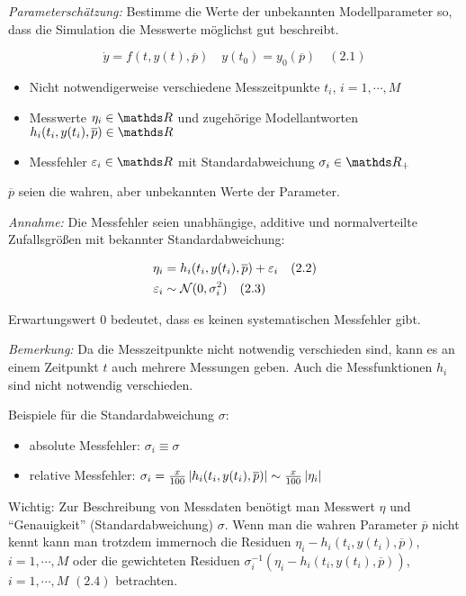 
\emph{Parameterschätzung:} Bestimme die Werte der unbekannten Modellparameter so, dass die Simulation die Messwerte möglichst gut beschreibt.



\[\dot y = f(t,y(t),\overline p) \quad y(t_0) = y_0(\overline p) \quad (2.1)\]


\begin{itemize}
\item Nicht notwendigerweise verschiedene Messzeitpunkte $t_i$, $i=1,\cdots,M$
\item Messwerte $\eta_i \in \R$ und zugehörige Modellantworten $h_i (t_i, y(t_i), \overline p) \in \R$
\item Messfehler $\eps_i \in \R$ mit Standardabweichung $\sigma_i \in \R_+$
\end{itemize}

$\overline p$ seien die wahren, aber unbekannten Werte der Parameter.

\emph{Annahme:} Die Messfehler seien unabhängige, additive und normalverteilte Zufallsgrößen mit bekannter Standardabweichung:

\begin{align*}
\eta_i &= h_i(t_i, y(t_i), \overline p) + \varepsilon_i \quad (2.2) \\
\varepsilon_i &\sim \mathcal N(0, \sigma_i^2) \quad (2.3)
\end{align*}

Erwartungswert $0$ bedeutet, dass es keinen systematischen Messfehler gibt.

\emph{Bemerkung:} Da die Messzeitpunkte nicht notwendig verschieden sind, kann es an einem Zeitpunkt $t$ auch mehrere Messungen geben. Auch die Messfunktionen $h_i$ sind nicht notwendig verschieden.

Beispiele für die Standardabweichung $\sigma:$

\begin{itemize}
\item absolute Messfehler: $\sigma_i \equiv \sigma$
\item relative Messfehler: $\sigma_i =  \frac x{100} \left| h_i(t_i,y(t_i),\overline p) \right| \sim \frac x{100} \left|\eta_i\right|$
\end{itemize}

Wichtig: Zur Beschreibung von Messdaten benötigt man Messwert $\eta$ und "`Genauigkeit"' (Standardabweichung) $\sigma$. Wenn man die wahren Parameter $\overline p$ nicht kennt kann man trotzdem immernoch die Residuen $\eta_i-h_i(t_i,y(t_i), \overline p)$, $i=1,\cdots,M$ oder die gewichteten Residuen $\sigma_i^{-1}(\eta_i-h_i(t_i,y(t_i), \overline p))$, $i=1,\cdots,M$ $(2.4)$  betrachten.

